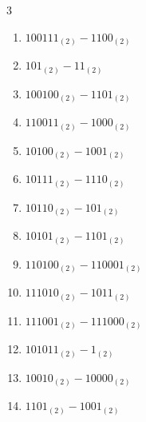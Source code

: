 \begin{multicols}{3}
\begin{enumerate}
\columnbreak %

  \item $100111_{(2)} - 1100_{(2)}$


  \item $101_{(2)} - 11_{(2)}$


  \item $100100_{(2)} - 1101_{(2)}$


  \item $110011_{(2)} - 1000_{(2)}$


  \item $10100_{(2)} - 1001_{(2)}$


  \item $10111_{(2)} - 1110_{(2)}$


  \item $10110_{(2)} - 101_{(2)}$


  \item $10101_{(2)} - 1101_{(2)}$


  \item $110100_{(2)} - 110001_{(2)}$


  \item $111010_{(2)} - 1011_{(2)}$


\columnbreak %

  \item $111001_{(2)} - 111000_{(2)}$


  \item $101011_{(2)} - 1_{(2)}$


  \item $10010_{(2)} - 10000_{(2)}$


  \item $1101_{(2)} - 1001_{(2)}$


\end{enumerate}
\end{multicols}
